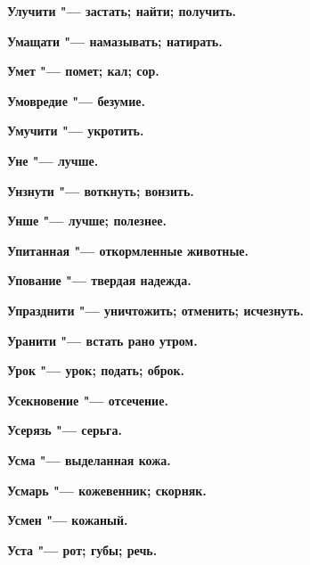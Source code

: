 \bfseries Улучити \normalfont{} "--- застать; найти; получить. 




\bfseries Умащати \normalfont{} "--- намазывать; натирать. 




\bfseries Умет \normalfont{} "--- помет; кал; сор. 




\bfseries Умовредие \normalfont{} "--- безумие. 




\bfseries Умучити \normalfont{} "--- укротить. 




\bfseries Уне \normalfont{} "--- лучше. 




\bfseries Унзнути \normalfont{} "--- воткнуть; вонзить. 




\bfseries Унше \normalfont{} "--- лучше; полезнее. 




\bfseries Упитанная \normalfont{} "--- откормленные животные. 




\bfseries Упование \normalfont{} "--- твердая надежда. 




\bfseries Упразднити \normalfont{} "--- уничтожить; отменить; исчезнуть. 




\bfseries Уранити \normalfont{} "--- встать рано утром. 




\bfseries Урок \normalfont{} "--- урок; подать; оброк. 




\bfseries Усекновение \normalfont{} "--- отсечение. 




\bfseries Усерязь \normalfont{} "--- серьга. 




\bfseries Усма \normalfont{} "--- выделанная кожа. 




\bfseries Усмарь \normalfont{} "--- кожевенник; скорняк. 




\bfseries Усмен \normalfont{} "--- кожаный. 




\bfseries Уста \normalfont{} "--- рот; губы; речь. 




